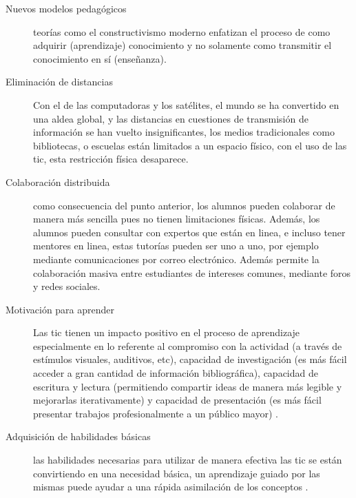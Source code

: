 \begin{description}

    \item[Nuevos modelos pedagógicos] teorías como el constructivismo moderno
        enfatizan el proceso de como adquirir (aprendizaje) conocimiento y no
        solamente como transmitir el conocimiento en sí (enseñanza).

    \item[Eliminación de distancias] Con el  de las computadoras y los satélites, el mundo se ha
        convertido en una aldea global, y las distancias en cuestiones de
        transmisión de información se han vuelto
        insignificantes\cite{mohammed2013information}, los medios tradicionales
        como bibliotecas, o escuelas están limitados a un espacio físico, con el
        uso de las \Gls{tic}, esta restricción física
        desaparece\cite{tinio:ict}.

    \item[Colaboración distribuida] como consecuencia del punto anterior, los
        alumnos pueden colaborar de manera más sencilla pues no tienen
        limitaciones físicas. Además, los alumnos pueden consultar con expertos
        que están en linea, e incluso tener mentores en linea, estas tutorías
        pueden ser uno a uno, por ejemplo mediante comunicaciones por correo
        electrónico. Además permite la colaboración masiva entre estudiantes de
        intereses comunes, mediante foros y redes sociales\cite{unesco:ict}.

    \item[Motivación para aprender] Las \Gls{tic} tienen un impacto positivo en
	    el proceso de aprendizaje especialmente en lo referente al
	    compromiso con la actividad (a través de estímulos visuales,
	    auditivos, etc), capacidad de investigación (es más fácil acceder a
	    gran cantidad de información bibliográfica), capacidad de escritura
	    y lectura (permitiendo compartir ideas de manera más legible y
	    mejorarlas iterativamente) y capacidad de presentación (es más fácil
	    presentar trabajos profesionalmente a un público
	    mayor)\cite{passey2004motivational}\cite{egenfeldt2007third}
        .

    \item[Adquisición de habilidades básicas] las habilidades necesarias para
	    utilizar de manera efectiva las \Gls{tic} se están convirtiendo en
	    una necesidad básica, un aprendizaje guiado por las mismas puede
	    ayudar a una rápida asimilación de los conceptos
        .

\end{description}

